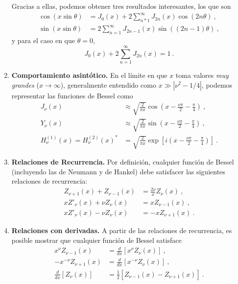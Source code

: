 \begin{propiedad}
\begin{enumerate}
        Gracias a ellas, podemos obtener tres resultados interesantes, los que son 
        \begin{align}
            \cos(x \sin \theta) & = J_0(x) + 2 \sum_{n*1}^\infty J_{2n}(x) \cos(2n\theta) \ , \\
            \sin(x \sin \theta) & = 2 \sum_{n=1}^\infty J_{2n-1}(x) \sin((2n-1)\theta) \ ,
        \end{align}
        y para el caso en que $\theta = 0$, 
        \begin{equation}
            J_0(x) + 2\sum_{n=1}^\infty J_{2n}(x) = 1 \ .
        \end{equation}

        \item \textbf{Comportamiento asintótico.} En el límite en que $x$ toma valores \emph{muy grandes} ($x \to \infty$), generalmente entendido como $x \gg |\nu^2 - 1/4|$, podemos representar las funciones de Bessel como
        \begin{align}
            J_\nu(x) & \approx \sqrt{\frac{2}{\pi x}} \cos\left( x - \frac{\nu \pi}{2} - \frac{\pi}{4} \right) \ , \\
            Y_\nu(x) & \approx \sqrt{\frac{2}{\pi x}} \sin\left( x - \frac{\nu \pi}{2} - \frac{\pi}{4} \right) \ , \\
            H^{(1)}_\nu(x) = H^{(2)}_\nu(x)^\ast & = \sqrt{\frac{2}{\pi x}} \exp\left[ i \left( x - \frac{\nu \pi}{2} - \frac{\pi}{4} \right) \right] \ .
        \end{align}
        \item \textbf{Relaciones de Recurrencia.} Por definición, cualquier función de Bessel (incluyendo las de Neumann y de Hankel) debe satisfacer las siguientes relaciones de recurrencia:
        \begin{align}
            Z_{\nu+1}(x) + Z_{\nu-1}(x) & = \frac{2\nu}{x} Z_\nu(x) \ , \\
            x Z'_\nu(x) + \nu Z_\nu(x) & =   x Z_{\nu-1}(x) \ , \\
            x Z'_\nu(x) - \nu Z_\nu(x) & = - x Z_{\nu+1}(x) \ . 
        \end{align}

        \item \textbf{Relaciones con derivadas.} A partir de las relaciones de recurrencia, es posible mostrar que cualquier función de Bessel satisface
        \begin{align}
            x^\nu Z_{\nu-1}(x) & = \frac{d}{dx}\left[ x^\nu Z_\nu(x) \right] \ , \\
            -x^{-\nu} Z_{\nu+1}(x) & = \frac{d}{dx}\left[ x^{-\nu} Z_\nu(x) \right] \ , \\
            \frac{d}{dx} \left[ Z_\nu(x) \right] & = \frac{1}{2} \left[ Z_{\nu-1}(x) - Z_{\nu+1}(x) \right] \ .
        \end{align}
    \end{enumerate}
\end{propiedad}

